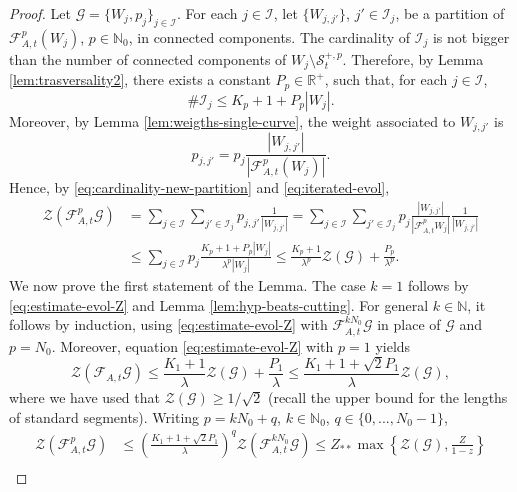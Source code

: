 \documentclass{amsart}
\numberwithin{equation}{section}
\renewcommand{\ge}{\geqslant}
\renewcommand{\le}{\leqslant}
\newcommand\cF{{\mathcal F}}
\newcommand\cG{{\mathcal G}}
\newcommand\cI{{\mathcal I}}
\newcommand\cS{{\mathcal S}}
\newcommand\cZ{{\mathcal Z}}
\newcommand\bN{{\mathbb N}}
\newcommand\bR{{\mathbb R}}
\newcommand{\catt}{\cF_{A,t}}
\begin{document}
\begin{proof}
 Let \(\cG = \{W_j, p_j\}_{j \in \cI}\). For each \(j \in \cI\), let \(\{W_{j,j'}\}\), \(j' \in \cI_j\), be a partition of \(\catt^{p}(W_j)\), \(p \in \bN_0\), in connected components. The cardinality of \(\cI_j\) is not bigger than the number of connected components of \(W_j \setminus \cS^{+,p}_t\). Therefore, by Lemma \ref{lem:trasversality2}, there exists a constant \(P_{p} \in \bR^+\), such that, for each \(j \in \cI\),
\begin{equation}\label{eq:cardinality-new-partition}
  \# \cI_j \le K_{p} + 1 + P_{p}|W_j|.
\end{equation}
Moreover, by Lemma \ref{lem:weigths-single-curve}, the weight associated to \(W_{j,j'}\) is
\begin{equation}\label{eq:iterated-evol}
p_{j,j'} = p_j \frac{|W_{j,j'}|}{|\catt^p(W_j)|}.
\end{equation}
Hence, by \eqref{eq:cardinality-new-partition} and \eqref{eq:iterated-evol},
\begin{equation}\label{eq:estimate-evol-Z}
\begin{split}
  \cZ(\catt^{p}\cG) &= \sum_{j \in \cI}\sum_{j' \in \cI_{j}} p_{j,j'} \frac{1}{|W_{j,j'}|}= \sum_{j \in \cI}\sum_{j' \in \cI_{j}}p_j\frac{|W_{j,j'}|}{|\catt^{p} W_j|}\frac{1}{|W_{j,j'}|} \\
  &\le \sum_{j \in \cI}p_j\frac{K_{p} +1 +P_{p}|W_j|}{\lambda^{p}|W_j|}\le \frac{K_{p} + 1}{\lambda^{p}}\cZ(\cG) + \frac{P_{p}}{\lambda^{p}}.
\end{split}
\end{equation}
We now prove the first statement of the Lemma. The case \(k = 1\) follows by \eqref{eq:estimate-evol-Z} and Lemma \ref{lem:hyp-beats-cutting}. For general \(k \in \bN\), it follows by induction, using \eqref{eq:estimate-evol-Z} with  \(\catt^{k N_0} \cG\) in place of \(\cG\) and \(p = N_0\). Moreover, equation \eqref{eq:estimate-evol-Z} with \(p = 1\) yields
\begin{equation}\label{eq:bad-estimate}
  \cZ \left(\catt \cG\right) \le\frac{K_{1} + 1}{\lambda}\cZ(\cG) + \frac{P_{1}}{\lambda} \le\frac{K_1 + 1+ \sqrt{2} P_1}{\lambda} \cZ(\cG),
\end{equation}
where we have used that \(\cZ(\cG) \ge 1/\sqrt{2}\) (recall the upper bound for the lengths of standard segments). Writing \(p = kN_0 + q\), \(k \in \bN_0\), \(q \in \{0,...,N_0-1\}\),
\begin{equation}\label{eq:growth-eq-proof}
\begin{split}
\cZ(\catt^p \cG) &\le \left( \frac{K_1 + 1+ \sqrt{2}P_1}{\lambda}\right)^q \cZ(\catt^{kN_0}\cG) \le Z_{**} \max\left\{\cZ(\cG), \frac{Z}{1-z}\right\} \\

\end{split}
\end{equation}
\end{proof}
\end{document}
